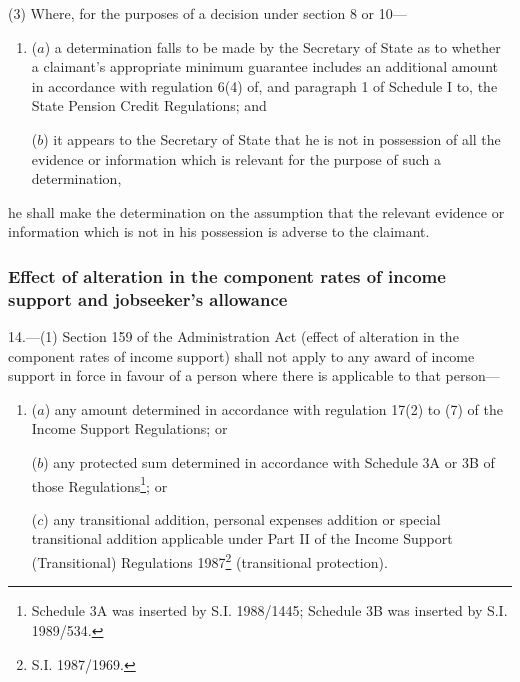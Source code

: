 \documentclass[12pt,a4paper]{article}
\begin{document}
(3) Where, for the purposes of a decision under section 8 or 10—
\begin{enumerate}\item[]
($a$) a determination falls to be made by the Secretary of State as to whether a claimant’s appropriate minimum guarantee includes an additional amount in accordance with regulation 6(4) of, and paragraph 1 of Schedule I to, the State Pension Credit Regulations; and

($b$) it appears to the Secretary of State that he is not in possession of all the evidence or information which is relevant for the purpose of such a determination,
\end{enumerate}
he shall make the determination on the assumption that the relevant evidence or information which is not in his possession is adverse to the claimant.


\subsubsection[14. Effect of alteration in the component rates of income support and jobseeker’s allowance]{Effect of alteration in the component rates of income support and jobseeker’s allowance}

14.—(1) Section 159 of the Administration Act (effect of alteration in the component rates of income support) shall not apply to any award of income support in force in favour of a person where there is applicable to that person—
\begin{enumerate}\item[]
($a$) any amount determined in accordance with regulation 17(2) to (7) of the Income Support Regulations; or

($b$) any protected sum determined in accordance with Schedule 3A or 3B of those Regulations\footnote{\frenchspacing Schedule 3A was inserted by S.I. 1988/1445; Schedule 3B was inserted by S.I. 1989/534.}; or

($c$) any transitional addition, personal expenses addition or special transitional addition applicable under Part II of the Income Support (Transitional) Regulations 1987\footnote{\frenchspacing S.I. 1987/1969.} (transitional protection).
\end{enumerate}
\end{document}
